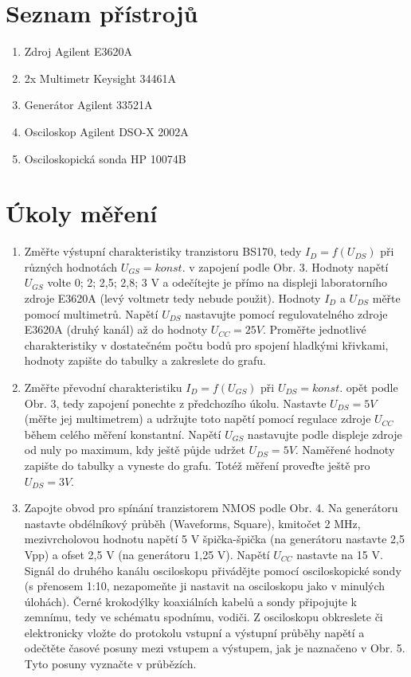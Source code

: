 \documentclass[a4paper, czech]{article}
\begin{document}
\pagebreak

\section{Seznam přístrojů}

\begin{enumerate}
    \item Zdroj Agilent E3620A
    \item 2x Multimetr Keysight 34461A
    \item Generátor Agilent 33521A
    \item Osciloskop Agilent DSO-X 2002A
    \item Osciloskopická sonda HP 10074B
\end{enumerate}

\section{Úkoly měření}

\begin{enumerate}
    \item Změřte výstupní charakteristiky tranzistoru BS170, tedy $I_D = f (U_{DS})$ při různých hodnotách $U_{GS} = konst.$ v zapojení podle Obr. 3. Hodnoty napětí $U_{GS}$ volte 0; 2; 2,5; 2,8; 3 V a odečítejte je přímo na displeji laboratorního zdroje E3620A (levý voltmetr tedy nebude použit). Hodnoty $I_D$ a $U_{DS}$ měřte pomocí multimetrů. Napětí $U_{DS}$ nastavujte pomocí regulovatelného zdroje E3620A (druhý kanál) až do hodnoty $U_{CC} = 25 V$. Proměřte jednotlivé charakteristiky v dostatečném počtu bodů pro spojení hladkými křivkami, hodnoty zapište do tabulky a zakreslete do grafu.
    \item Změřte převodní charakteristiku $I_D = f (U_{GS})$ při $U_{DS} = konst.$ opět podle Obr. 3, tedy zapojení ponechte z předchozího úkolu. Nastavte $U_{DS} = 5 V$ (měřte jej multimetrem) a udržujte toto napětí pomocí regulace zdroje $U_{CC}$ během celého měření konstantní. Napětí $U_{GS}$ nastavujte podle displeje zdroje od nuly po maximum, kdy ještě půjde udržet $U_{DS} = 5 V$. Naměřené hodnoty zapište do tabulky a vyneste do grafu. Totéž měření proveďte ještě pro $U_{DS} = 3 V$. 
    \item Zapojte obvod pro spínání tranzistorem NMOS podle Obr. 4. Na generátoru nastavte obdélníkový průběh (Waveforms, Square), kmitočet 2 MHz, mezivrcholovou hodnotu napětí 5 V špička-špička (na generátoru nastavte 2,5 Vpp)  a ofset 2,5 V (na generátoru 1,25 V). Napětí $U_{CC}$ nastavte na 15 V. Signál do druhého kanálu osciloskopu přivádějte pomocí osciloskopické sondy (s přenosem 1:10, nezapomeňte ji nastavit na osciloskopu jako v minulých úlohách). Černé krokodýlky koaxiálních kabelů a sondy připojujte k zemnímu, tedy ve schématu spodnímu, vodiči. Z osciloskopu obkreslete či elektronicky vložte do protokolu vstupní a výstupní průběhy napětí a odečtěte časové posuny mezi vstupem a výstupem, jak je naznačeno v Obr. 5. Tyto posuny vyznačte v průbězích.
\end{enumerate}
\end{document}
